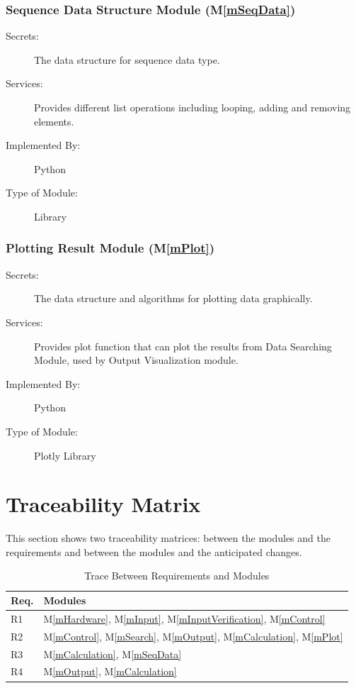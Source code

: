 \documentclass[12pt, titlepage]{article}
\newcommand{\mref}[1]{M\ref{#1}}
\begin{document}
\subsubsection{Sequence Data Structure Module (\mref{mSeqData})}
\begin{description}
\item[Secrets:] The data structure for sequence data type. 
\item[Services:] Provides different list operations including looping, adding and removing elements. 
\item[Implemented By:] Python
\item[Type of Module:] Library
\end{description}

\subsubsection{Plotting Result Module (\mref{mPlot})}
\begin{description}
\item[Secrets:] The data structure and algorithms for plotting data graphically. 
\item[Services:] Provides plot function that can plot the results from Data Searching Module, used by Output Visualization module. 
\item[Implemented By:] Python
\item[Type of Module:] Plotly Library
\end{description}

\section{Traceability Matrix} \label{SecTM}

This section shows two traceability matrices: between the modules and the
requirements and between the modules and the anticipated changes.

\begin{table}[H]
\centering
\begin{tabular}{p{} p{}}
\toprule
\textbf{Req.} & \textbf{Modules}\\
\midrule
R1 & \mref{mHardware}, \mref{mInput}, \mref{mInputVerification}, \mref{mControl}\\
R2 & \mref{mControl}, \mref{mSearch}, \mref{mOutput}, \mref{mCalculation},  \mref{mPlot}\\
R3 & \mref{mCalculation}, \mref{mSeqData}\\
R4 & \mref{mOutput}, \mref{mCalculation}\\
\bottomrule
\end{tabular}
\caption{Trace Between Requirements and Modules}
\label{TblRT}
\end{table}
\end{document}
